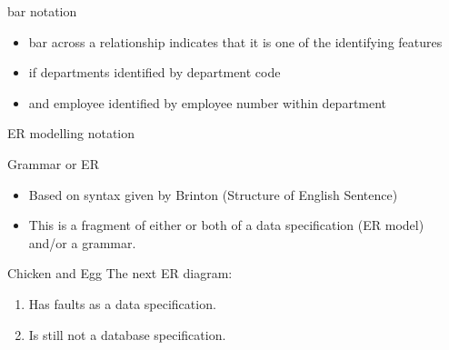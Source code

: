 \documentclass[xcolor=pst,dvips]{beamer}   %
\renewcommand{\erpictureFolder}[0]{../../SharedPictures}
\begin{document}
\begin{frame}{bar notation}
\begin{itemize}
\item bar across a relationship indicates that it is one of the identifying features
\item if departments identified by department code
\item and employee identified by employee number within department 
\end{itemize}
\end{frame}

\iffalse
\begin{frame}
\begin{center}{ER modelling notation}
(departmentEmployeeComposite here)
\scalebox{0.50}{

}
\end{center}
\end{frame}
\fi


\begin{frame}{ER modelling notation}
\begin{center}
\scalebox{0.85}{

}
\end{center}
\end{frame}


\begin{frame}{Grammar or ER}
\begin{itemize}
\pause \item Based on syntax given by Brinton (Structure of English Sentence)
\end{itemize}
\begin{center}
\scalebox{0.85}{

}
\end{center}
\begin{itemize}
\pause \item This is a fragment of either or both of a data specification (ER model) and/or a grammar.
\end{itemize}
\end{frame}


\begin{frame}{Chicken and Egg}
The next ER diagram:
\begin{center}
\scalebox{0.9}{

}
\end{center}
\begin{center}
\begin{enumerate}
\item Has faults as a data specification.
\item Is still not a database specification. 
\end{enumerate}
\end{center}
\end{frame}
\end{document}
